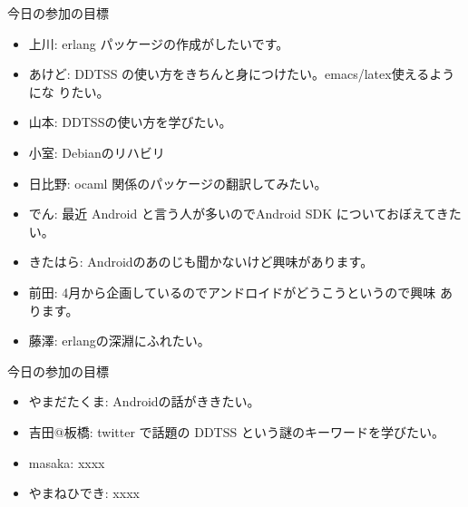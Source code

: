 \frame{\titlepage{}}


\begin{frame}{今日の参加の目標}
\begin{itemize}
 \item 上川: erlang パッケージの作成がしたいです。
 \item あけど: DDTSS の使い方をきちんと身につけたい。emacs/latex使えるようにな
       りたい。
 \item 山本: DDTSSの使い方を学びたい。
 \item 小室: Debianのリハビリ
 \item 日比野: ocaml 関係のパッケージの翻訳してみたい。
 \item でん: 最近 Android と言う人が多いのでAndroid SDK についておぼえてきた
       い。
 \item きたはら: Androidのあのじも聞かないけど興味があります。
 \item 前田: 4月から企画しているのでアンドロイドがどうこうというので興味
       あります。
 \item 藤澤: erlangの深淵にふれたい。
\end{itemize}
\end{frame}

\begin{frame}{今日の参加の目標}
\begin{itemize}
 \item やまだたくま: Androidの話がききたい。
 \item 吉田@板橋: twitter で話題の DDTSS という謎のキーワードを学びたい。
 \item masaka: xxxx
 \item やまねひでき: xxxx
\end{itemize}
\end{frame}

